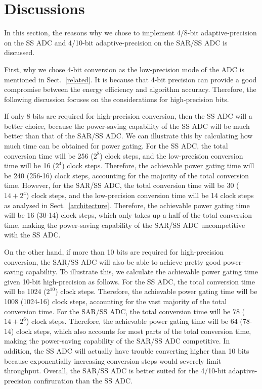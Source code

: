 \section{Discussions}\label{discussion}

In this section, the reasons why we chose to implement 4/8-bit adaptive-precision on the SS ADC and 4/10-bit adaptive-precision on the SAR/SS ADC is discussed.

First, why we chose 4-bit conversion as the low-precision mode of the ADC is mentioned in Sect.~\ref{related}. It is because that 4-bit precision can provide a good compromise between the energy efficiency and algorithm accuracy. Therefore, the following discussion focuses on the considerations for high-precision bits.

If only 8 bits are required for high-precision conversion, then the SS ADC will a better choice, because the power-saving capability of the SS ADC will be much better than that of the SAR/SS ADC. We can illustrate this by calculating how much time can be obtained for power gating. For the SS ADC, the total conversion time will be 256 ($2^8$) clock steps, and the low-precision conversion time will be 16 ($2^4$) clock steps. Therefore, the achievable power gating time will be 240 (256-16) clock steps, accounting for the majority of the total conversion time. However, for the SAR/SS ADC, the total conversion time will be 30 ($14+2^4$) clock steps, and the low-precision conversion time will be 14 clock steps as analysed in Sect.~\ref{architecture}. Therefore, the achievable power gating time will be 16 (30-14) clock steps, which only takes up a half of the total conversion time, making the power-saving capability of the SAR/SS ADC uncompetitive with the SS ADC.

On the other hand, if more than 10 bits are required for high-precision conversion, the SAR/SS ADC will also be able to achieve pretty good power-saving capability. To illustrate this, we calculate the achievable power gating time given 10-bit high-precision as follows. For the SS ADC, the total conversion time will be 1024 ($2^{10}$) clock steps. Therefore, the achievable power gating time will be 1008 (1024-16) clock steps, accounting for the vast majority of the total conversion time. For the SAR/SS ADC, the total conversion time will be 78 ($14+2^6$) clock steps. Therefore, the achievable power gating time will be 64 (78-14) clock steps, which also accounts for most parts of the total conversion time, making the power-saving capability of the SAR/SS ADC competitive.  
In addition, the SS ADC will actually have trouble converting higher than 10 bits because exponentially increasing conversion steps would severely limit throughput. Overall, the SAR/SS ADC is better suited for the 4/10-bit adaptive-precision confiruration than the SS ADC.

